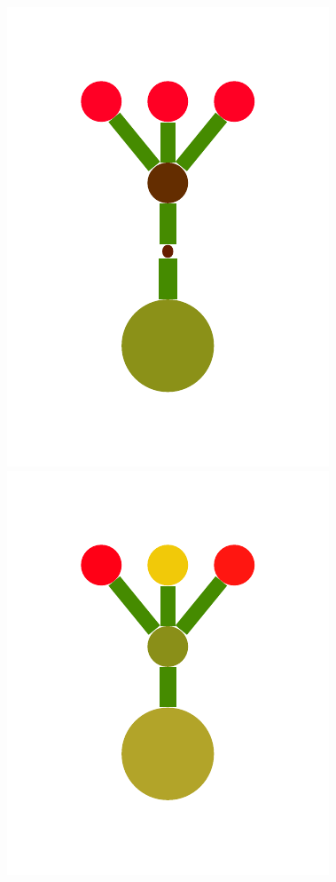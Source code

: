 \documentclass[a4paper,10pt]{article}
\begin{document}
\begin{figure}[t]
  \includegraphics[scale=.26]{../figures/vector/2-2-initProgram-2.pdf}
  \includegraphics[scale=.26]{../figures/vector/2-2-initProgram-3.pdf}

\end{figure}
\end{document}
